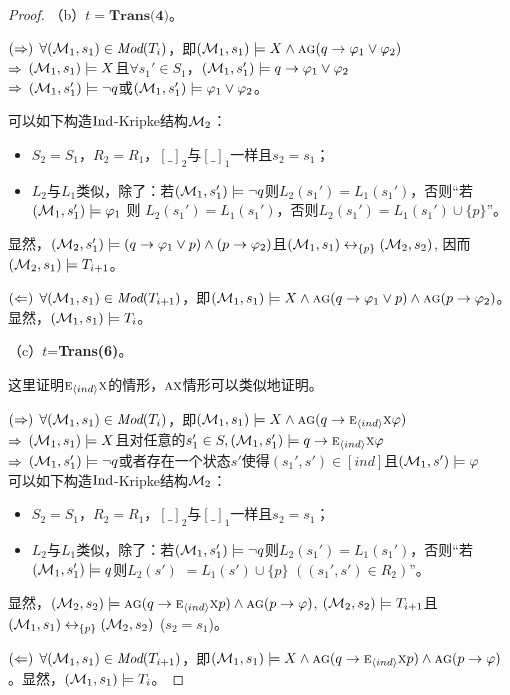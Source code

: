 \begin{proof}
	（b）$t=\textbf{Trans(4)}$。
	
	$(\Rightarrow)$	$\forall({\cal M}_1,s_1) \in \textit{Mod}(T_i)$，即$({\cal M}_1,s_1) \models X \wedge \textsc{a}\textsc{g} (q \rightarrow \varphi_1 \vee \varphi_2)$ \\
	$\Rightarrow$ $({\cal M}_1,s_1) \models X$且$\forall s_1'\in S_1$，$({\cal M}_1, s_1') \models q \rightarrow \varphi_1 \vee \varphi_2$\\
	$\Rightarrow$ $({\cal M}_1,s_1')\models \neg q$或$({\cal M}_1,s_1')\models \varphi_1 \vee \varphi_2$。
	
	可以如下构造$\textrm{Ind}$-Kripke结构${\cal M}_2$：
	\begin{itemize}
		\item $S_2=S_1$，$R_2=R_1$，$[\_]_2$与$[\_]_1$一样且$s_2=s_1$；
		\item $L_2$与$L_1$类似，除了：若$({\cal M}_1, s_1') \models \neg q$则$L_2(s_1') = L_1(s_1')$，否则“若$({\cal M}_1,s_1') \models \varphi_1$ 则 $L_2(s_1')=L_1(s_1')$，否则$L_2(s_1')=L_1(s_1') \cup \{p\}$”。
	\end{itemize}
	显然，$({\cal M}_2,s_1') \models (q\rightarrow \varphi_1 \vee p) \wedge (p \rightarrow \varphi_2)$且$({\cal M}_1, s_1) \leftrightarrow_{\{p\}} ({\cal M}_2, s_2)$, 因而$({\cal M}_2,s_1) \models T_{i+1}$。
	
	$(\Leftarrow)$  $\forall ({\cal M}_1, s_1) \in \textit{Mod}(T_{i+1})$，即$({\cal M}_1,s_1) \models X \wedge \textsc{a}\textsc{g} (q\rightarrow \varphi_1 \vee p) \wedge \textsc{a}\textsc{g}(p \rightarrow \varphi_2)$。 显然，$({\cal M}_1, s_1) \models T_i$。
	
	（c）$t$=\textbf{Trans(6)}。
	
	这里证明$\textsc{e}_{{\langle{ind}\rangle}} \textsc{x}$的情形，$\textsc{a} \textsc{x}$情形可以类似地证明。
	
	$(\Rightarrow)$ $\forall({\cal M}_1,s_1) \in \textit{Mod}(T_i)$，即$({\cal M}_1,s_1) \models X \wedge \textsc{a}\textsc{g}(q \rightarrow \textsc{e}_{{\langle{ind}\rangle}}\textsc{x} \varphi)$\\
	$\Rightarrow$ $({\cal M}_1,s_1) \models X$且对任意的$s_1'\in S, ({\cal M}_1,s_1') \models q \rightarrow \textsc{e}_{{\langle{ind}\rangle}} \textsc{x} \varphi$\\
	$\Rightarrow$ $({\cal M}_1,s_1') \models \neg q$或者存在一个状态$s'$使得$(s_1', s') \in [ind]$且$({\cal M}_1,s') \models \varphi$\\
	
	可以如下构造$\textrm{Ind}$-Kripke结构${\cal M}_2$：
	\begin{itemize}
		\item $S_2=S_1$，$R_2=R_1$，$[\_]_2$与$[\_]_1$一样且$s_2=s_1$；
		\item $L_2$与$L_1$类似，除了：若$({\cal M}_1, s_1') \models \neg q$则$L_2(s_1') = L_1(s_1')$，否则“若$({\cal M}_1,s_1') \models q$则$L_2(s')$ $=L_1(s')\cup \{p\}$ $((s_1',s')\in R_2)$”。
	\end{itemize}
	显然，$({\cal M}_2,s_2) \models \textsc{a}\textsc{g}(q\rightarrow \textsc{e}_{{\langle{ind}\rangle}} \textsc{x} p) \wedge \textsc{a}\textsc{g}(p \rightarrow \varphi)$, $({\cal M}_2,s_2) \models T_{i+1}$且$({\cal M}_1, s_1) \leftrightarrow_{\{p\}} ({\cal M}_2, s_2)$ ($s_2=s_1$)。
	
	$(\Leftarrow)$ $\forall({\cal M}_1, s_1) \in \textit{Mod}(T_{i+1})$，即$({\cal M}_1,s_1) \models X \wedge \textsc{a}\textsc{g}(q\rightarrow \textsc{e}_{{\langle{ind}\rangle}} \textsc{x} p) \wedge \textsc{a}\textsc{g}(p \rightarrow \varphi)$。显然，$({\cal M}_1, s_1) \models T_i$。
\end{proof}


